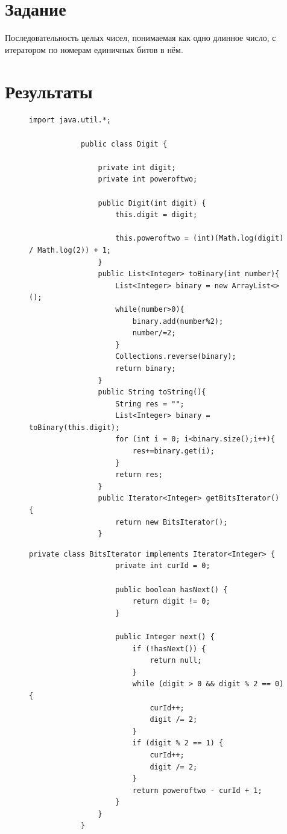 \documentclass[a4paper, 14pt]{extarticle}
\begin{document}
	\renewcommand{\ttdefault}{pcr}
	
	\setlength{\tabcolsep}{3pt}
	\newpage
	\setcounter{page}{2}
	
	\section{Задание}\label{Sect::task}
	
Последовательность целых чисел, понимаемая как одно длинное число, 
с итератором по номерам единичных битов в нём.
	
	\section{Результаты}\label{Sect::res}
	
	\begin{figure}[!htb]
		\begin{lstlisting}[language={},caption={Класс Digit, в котором реализована программа по заданию},label={lst:code1}]
			import java.util.*;
			
			public class Digit {
				
				private int digit;
				private int poweroftwo;
				
				public Digit(int digit) {
					this.digit = digit;
					
					this.poweroftwo = (int)(Math.log(digit) / Math.log(2)) + 1;
				}
				public List<Integer> toBinary(int number){
					List<Integer> binary = new ArrayList<>();
					while(number>0){
						binary.add(number%2);
						number/=2;
					}
					Collections.reverse(binary);
					return binary;
				}
				public String toString(){
					String res = "";
					List<Integer> binary = toBinary(this.digit);
					for (int i = 0; i<binary.size();i++){
						res+=binary.get(i);
					}
					return res;
				}
				public Iterator<Integer> getBitsIterator() {
					return new BitsIterator();
				}
				\end{lstlisting}
			\end{figure}
		
	\newpage
		\begin{figure}[!htb]
		\begin{lstlisting}[language={},caption={Класс Digit, в котором реализована программа по заданию(продолжение)},label={lst:code1}]
				private class BitsIterator implements Iterator<Integer> {
					private int curId = 0;
					
					public boolean hasNext() {
						return digit != 0;
					}
					
					public Integer next() {
						if (!hasNext()) {
							return null;
						}
						while (digit > 0 && digit % 2 == 0) {
							curId++;
							digit /= 2;
						}
						if (digit % 2 == 1) {
							curId++;
							digit /= 2;
						}
						return poweroftwo - curId + 1;
					}
				}
			}
			
		\end{lstlisting}
	\end{figure}
	
\end{document}
